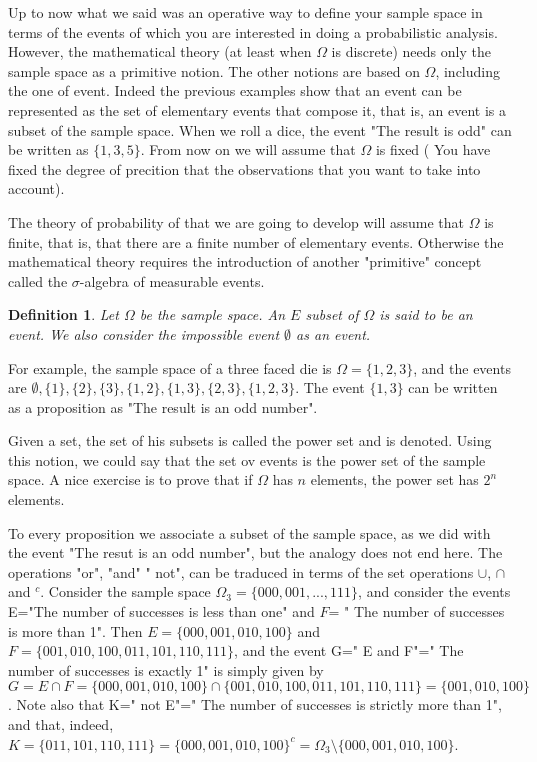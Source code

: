 \documentclass[12pt]{article}
\newtheorem{definition}[theorem]{Definition}
\newcommand{\<}{{\langle \!\! \langle}}
\renewcommand{\>}{{\rangle \!\! \rangle}}
\newcommand{\commento}[1]{
	\par\noindent
	\colorbox{light}{\begin{minipage}{120 mm}#1\end{minipage}}
	\par\noindent
}
\begin{document}
Up to now what we said was an operative way to define your sample space in terms of the events of which you are interested in doing a probabilistic analysis. However, the mathematical theory (at least when $\Omega$ is discrete) needs only the sample space as a primitive notion. The other notions are based on $\Omega$, including the one of event. Indeed the previous examples show that an event can be represented as the set of elementary events that compose it, that is, an event is a subset of the sample space.
 When we roll a dice, the event "The result is odd"  can be written as $\{1,3,5\}$.
From now on we will assume that $\Omega$ is fixed ( You have fixed the degree of precition that the observations that you want to take into account). 
\commento{ The theory of probability of that we are going to develop will assume that $\Omega$ is finite, that is, that there are a finite number of elementary events. Otherwise the mathematical theory requires the introduction of another "primitive" concept called the $\sigma$-algebra of measurable events.}

\begin{definition}
Let $\Omega$ be the sample space. An $E$ subset of $\Omega$ is said to be an event. We also consider the impossible event $\emptyset$ as an event.   
\end{definition}


For example, the sample space of a three faced die is $\Omega = \{1,2,3\}$, and the events are $\emptyset, \{1\}, \{2\}, \{3\}, \{1,2\}, \{1,3\}, \{2,3\}, \{1,2,3\}$. The event $\{1,3\}$ can be written as a proposition as "The result is an odd number".
\commento{ Given a set, the set of his subsets is called the power set and is denoted. Using this notion, we could say that the set ov events is the power set of the sample space. A nice exercise is to prove that if $\Omega$ has $n$ elements, the power set has $2^n$ elements.}
 
To every proposition we associate a subset of the sample space, as we did with the event "The resut is an odd number", but the analogy does not end here. The operations "or", "and" " not", can be traduced in terms of the set operations $\cup$, $\cap$ and $^c$. Consider the sample space $\Omega_3=\{000,001,...,111\}$, and consider the events E="The number of successes is less than one" and $F$= " The number of successes is more than 1". Then $E=\{000,001,010,100\}$ and $F = \{001,010,100,011,101,110,111\}$, and the event G=" E and F"=" The number of successes is exactly 1" is simply given by $G=E\cap F= \{000,001,010,100\}\cap \{001,010,100,011,101,110,111\}=\{001,010,100\}$. Note also that K=" not E"=" The number of successes is strictly more than 1", and that, indeed, $K=\{011,101,110,111\}=\{000,001,010,100\}^c=\Omega_3\setminus \{000,001,010,100\}$.     
\end{document}
